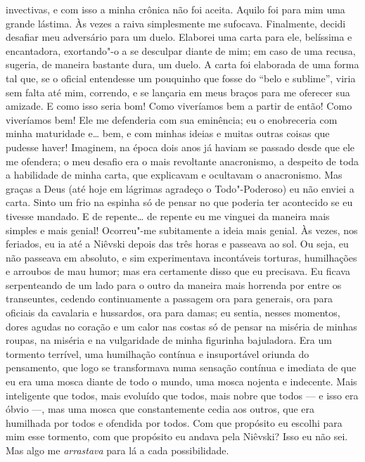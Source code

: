 invectivas, e com isso a minha crônica não foi aceita.  Aquilo foi para mim uma
grande lástima. Às vezes a raiva simplesmente me sufocava. Finalmente, decidi
desafiar meu adversário para um duelo.  Elaborei uma carta para ele, belíssima
e encantadora, exortando"-o a se desculpar diante de mim; em caso de uma recusa,
sugeria, de maneira bastante dura, um duelo. A carta foi elaborada de uma forma
tal que, se o oficial entendesse um pouquinho que fosse do “belo e sublime”,
viria sem falta até mim, correndo, e se lançaria em meus braços para me
oferecer sua amizade. E como isso seria bom! Como viveríamos bem a partir de
então! Como viveríamos bem! Ele me defenderia com sua eminência; eu o
enobreceria com minha maturidade e\ldots{} bem, e com minhas ideias e muitas
outras coisas que pudesse haver! Imaginem, na época dois anos já haviam se
passado desde que ele me ofendera; o meu desafio era o mais revoltante
anacronismo, a despeito de toda a habilidade de minha carta, que explicavam e
ocultavam o anacronismo. Mas graças a Deus (até hoje em lágrimas agradeço o
Todo"-Poderoso) eu não enviei a carta. Sinto um frio na espinha só de pensar no
que poderia ter acontecido se eu tivesse mandado. E de repente\ldots{} de
repente eu me vinguei da maneira mais simples e mais genial! Ocorreu"-me
subitamente a ideia mais genial. Às vezes, nos feriados, eu ia até a Niêvski
depois das três horas e passeava ao sol. Ou seja, eu não passeava em absoluto,
e sim experimentava incontáveis torturas, humilhações e arroubos de mau humor;
mas era certamente disso que eu precisava. Eu ficava serpenteando de um lado
para o outro da maneira mais horrenda por entre os transeuntes, cedendo
continuamente a passagem ora para generais, ora para oficiais da cavalaria e
hussardos, ora para damas; eu sentia, nesses momentos, dores agudas no coração
e um calor nas costas só de pensar na miséria de minhas roupas, na miséria e na
vulgaridade de minha figurinha bajuladora. Era um tormento terrível, uma
humilhação contínua e insuportável oriunda do pensamento, que logo se
transformava numa sensação contínua e imediata de que eu era uma mosca diante
de todo o mundo, uma mosca nojenta e indecente. Mais inteligente que todos,
mais evoluído que todos, mais nobre que todos --- e isso era óbvio ---, mas uma
mosca que constantemente cedia aos outros, que era humilhada por todos e
ofendida por todos. Com que propósito eu escolhi para mim esse tormento, com
que propósito eu andava pela Niêvski? Isso eu não sei. Mas algo me
\textit{arrastava} para lá a cada possibilidade.

